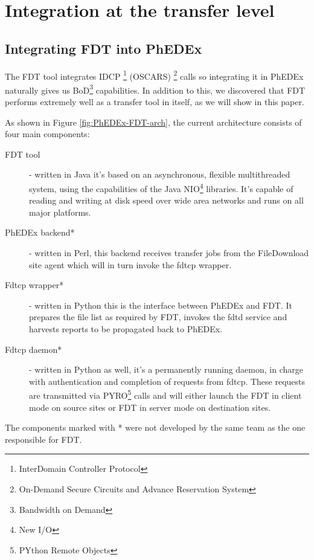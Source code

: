 \section{Integration at the transfer level}

\subsection{Integrating FDT into PhEDEx}
The FDT\cite{FDT}  tool integrates IDCP
\footnote{InterDomain Controller Protocol} (OSCARS)
\footnote{On-Demand Secure Circuits and Advance Reservation System} calls so
integrating it in PhEDEx naturally gives us BoD\footnote{Bandwidth on Demand}
capabilities. In addition to this, we discovered that FDT performs extremely well
as a transfer tool in itself, as we will show in this paper.

As shown in Figure \ref{fig:PhEDEx-FDT-arch}, the current architecture consists
of four main components:
\begin{description}
	\item[FDT tool] - written in Java it's based on an asynchronous, flexible 
multithreaded system, using the capabilities of the Java NIO\footnote{New I/O} 
libraries. It's capable of reading and writing at disk speed over wide area 
networks and runs on all major platforms. 
	\item[PhEDEx backend*] - written in Perl, this backend
receives transfer jobs from the FileDownload site agent which will in turn 
invoke the fdtcp wrapper. 
	\item[Fdtcp wrapper*] - written in Python this is the 
interface between PhEDEx and FDT. It prepares the file list as required by FDT, 
invokes the fdtd service and harvests reports to be propagated back to PhEDEx.
	\item[Fdtcp daemon*] - written in Python as well, it's 
a permanently running daemon, in charge with authentication and completion of requests 
from fdtcp. These requests are transmitted via PYRO\footnote{PYthon Remote Objects} 
calls and will either launch the FDT in client mode on source sites or FDT in server 
mode on destination sites.
\end{description}

The components marked with * were not developed by the same team as the one responsible 
for FDT.

